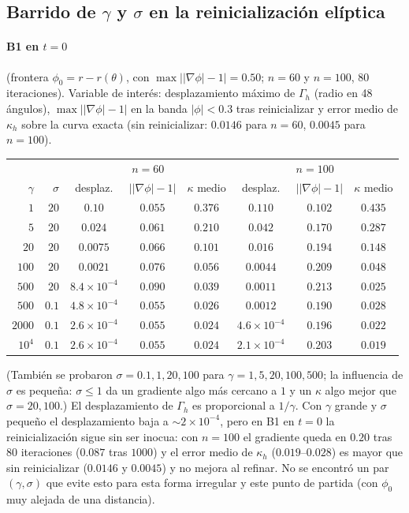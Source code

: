 \subsection{Barrido de $\gamma$ y $\sigma$ en la reinicialización elíptica}

\paragraph{B1 en $t=0$} (frontera $\phi_0=r-r(\theta)$, con $\max\big||\nabla\phi|-1\big|=0.50$; $n=60$ y $n=100$, $80$ iteraciones). Variable de interés: desplazamiento máximo de $\Gamma_h$ (radio en 48 ángulos), $\max\big||\nabla\phi|-1\big|$ en la banda $|\phi|<0.3$ tras reinicializar y error medio de $\kappa_h$ sobre la curva exacta (sin reinicializar: $0.0146$ para $n=60$, $0.0045$ para $n=100$).
\begin{center}
\begin{tabular}{rr|ccc|ccc}
\toprule
 & & \multicolumn{3}{c|}{$n=60$} & \multicolumn{3}{c}{$n=100$}\\
$\gamma$ & $\sigma$ & desplaz. & $\big||\nabla\phi|-1\big|$ & $\kappa$ medio & desplaz. & $\big||\nabla\phi|-1\big|$ & $\kappa$ medio\\
\midrule
$1$ & $20$ & $0.10$ & $0.055$ & $0.376$ & $0.110$ & $0.102$ & $0.435$\\
$5$ & $20$ & $0.024$ & $0.061$ & $0.210$ & $0.042$ & $0.170$ & $0.287$\\
$20$ & $20$ & $0.0075$ & $0.066$ & $0.101$ & $0.016$ & $0.194$ & $0.148$\\
$100$ & $20$ & $0.0021$ & $0.076$ & $0.056$ & $0.0044$ & $0.209$ & $0.048$\\
$500$ & $20$ & $8.4\times10^{-4}$ & $0.090$ & $0.039$ & $0.0011$ & $0.213$ & $0.025$\\
$500$ & $0.1$ & $4.8\times10^{-4}$ & $0.055$ & $0.026$ & $0.0012$ & $0.190$ & $0.028$\\
$2000$ & $0.1$ & $2.6\times10^{-4}$ & $0.055$ & $0.024$ & $4.6\times10^{-4}$ & $0.196$ & $0.022$\\
$10^4$ & $0.1$ & $2.6\times10^{-4}$ & $0.055$ & $0.024$ & $2.1\times10^{-4}$ & $0.203$ & $0.019$\\
\bottomrule
\end{tabular}
\end{center}
(También se probaron $\sigma=0.1,1,20,100$ para $\gamma=1,5,20,100,500$; la influencia de $\sigma$ es pequeña: $\sigma\le1$ da un gradiente algo más cercano a $1$ y un $\kappa$ algo mejor que $\sigma=20,100$.) El desplazamiento de $\Gamma_h$ es proporcional a $1/\gamma$. Con $\gamma$ grande y $\sigma$ pequeño el desplazamiento baja a $\sim2\times10^{-4}$, pero en B1 en $t=0$ la reinicialización sigue sin ser inocua: con $n=100$ el gradiente queda en $0.20$ tras $80$ iteraciones ($0.087$ tras $1000$) y el error medio de $\kappa_h$ ($0.019$--$0.028$) es mayor que sin reinicializar ($0.0146$ y $0.0045$) y no mejora al refinar. No se encontró un par $(\gamma,\sigma)$ que evite esto para esta forma irregular y este punto de partida (con $\phi_0$ muy alejada de una distancia).


